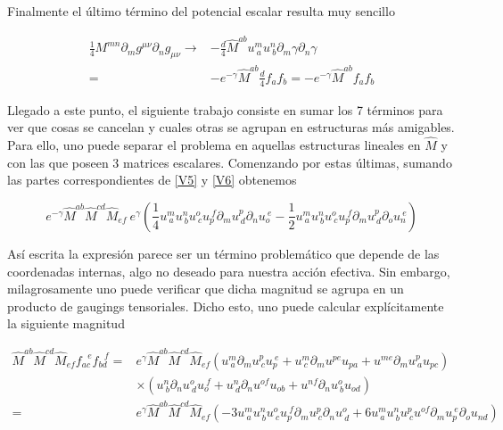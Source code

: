 \documentclass{article}
\numberwithin{equation}{section}
\begin{document}
Finalmente el último término del potencial escalar resulta muy sencillo

\begin{equation}\label{V7}
\begin{aligned}
\frac{1}{4} M^{m n} \partial_m g^{\mu \nu} \partial_n g_{\mu \nu} \longrightarrow& - \frac{d}{4} \hat{M}^{a b} u^m_{\ a} u^n_{\ b} \partial_m \gamma \partial_n \gamma\\
=& - e^{- \gamma} \hat{M}^{a b} \frac{d}{4} f_a f_b = - e^{- \gamma} \hat{M}^{a b} f_a f_b
\end{aligned}
\end{equation}

Llegado a este punto, el siguiente trabajo consiste en sumar los 7 términos para ver que cosas se cancelan y cuales otras se agrupan en estructuras más amigables. Para ello, uno puede separar el problema en aquellas estructuras lineales en $ \hat{M} $ y con las que poseen 3 matrices escalares. Comenzando por  estas últimas, sumando las partes correspondientes de \ref{V5} y \ref{V6} obtenemos

\begin{equation}
e^{-\gamma} \hat{M}^{a b} \hat{M}^{c d}\hat{M}_{e f} \ e^{\gamma}  \left( \frac{1}{4}u^{m}_{\ a} u^{n}_{\ b} u^{o}_{\ c} u_{p}^{\ f} \partial_m u^{p}_{\ d} \partial_n u_{o}^{\ e} - \frac{1}{2}u^{m}_{\ a} u^{n}_{\ b} u^{o}_{\ c} u_{p}^{\ f} \partial_m u^{p}_{\ d} \partial_o u_{n}^{\ e} \right)
\end{equation}

Así escrita la expresión parece ser un término problemático que depende de las coordenadas internas, algo no deseado para nuestra acción efectiva. Sin embargo, milagrosamente uno puede verificar que dicha magnitud se agrupa en un producto de gaugings tensoriales. Dicho esto, uno puede calcular explícitamente la siguiente magnitud

\begin{equation}
\begin{aligned}
\hat{M}^{a b} \hat{M}^{c d}\hat{M}_{e f} f_{a c}^{\ \ \ e} f_{b d}^{\ \ \ f} =& e^{\gamma} \hat{M}^{a b} \hat{M}^{c d}\hat{M}_{e f} \left( u^{m}_{ \ a} \partial_m u^{p}_{\ c} u_{ p}^{\ e} + u^{m}_{ \ c} \partial_m u^{p e} u_{ p a} + u^{m e} \partial_m u^{p}_{\ a} u_{ p c} \right)\\
&\times \left( u^{n}_{ \ b} \partial_n u^{o}_{\ d} u_{ o}^{\ f} + u^{n}_{ \ d} \partial_n u^{o f} u_{ o b} + u^{n f} \partial_n u^{o}_{\ b} u_{ o d} \right)\\
=& e^{\gamma} \hat{M}^{a b} \hat{M}^{c d}\hat{M}_{e f} \left( -3 u^{m}_{\ a} u^{n}_{\ b} u^{o}_{\ c} u_{p}^{\ f} \partial_m u^{p}_{\ c} \partial_n u^{o}_{\ d} + 6 u^{m}_{\ a} u^{n}_{\ b} u^{p}_{\ c} u^{o f} \partial_m u_{p}^{\ e} \partial_o u_{n d} \right)
\end{aligned}
\end{equation}
\end{document}
